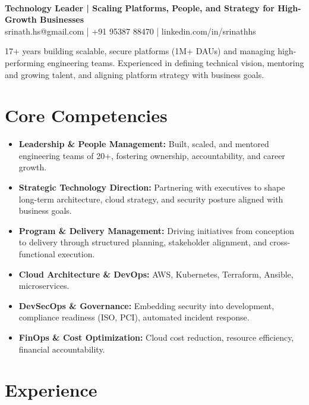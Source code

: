 \documentclass[11pt]{article}
\newcommand{\name}[1]{\noindent{\LARGE\sffamily\textbf{#1}}}
\begin{document}
\pagestyle{empty}
\color{bodytext}

\name{Srinath H S}\\[0.5em]
\textbf{Technology Leader | Scaling Platforms, People, and Strategy for High-Growth Businesses}\\[0.3em]
srinath.hs@gmail.com \quad | \quad +91 95387 88470 \quad | \quad linkedin.com/in/srinathhs

17+ years building scalable, secure platforms (1M+ DAUs) and managing high-performing engineering teams. Experienced in defining technical vision, mentoring and growing talent, and aligning platform strategy with business goals.

\section*{Core Competencies}
\begin{itemize}[leftmargin=*, itemsep=-0.5em]
  \item \textbf{Leadership \& People Management:} Built, scaled, and mentored engineering teams of 20+, fostering ownership, accountability, and career growth.
  \item \textbf{Strategic Technology Direction:} Partnering with executives to shape long-term architecture, cloud strategy, and security posture aligned with business goals.
  \item \textbf{Program \& Delivery Management:} Driving initiatives from conception to delivery through structured planning, stakeholder alignment, and cross-functional execution.
  \item \textbf{Cloud Architecture \& DevOps:} AWS, Kubernetes, Terraform, Ansible, microservices.
  \item \textbf{DevSecOps \& Governance:} Embedding security into development, compliance readiness (ISO, PCI), automated incident response.
  \item \textbf{FinOps \& Cost Optimization:} Cloud cost reduction, resource efficiency, financial accountability.
\end{itemize}

\section*{Experience}
\end{document}
